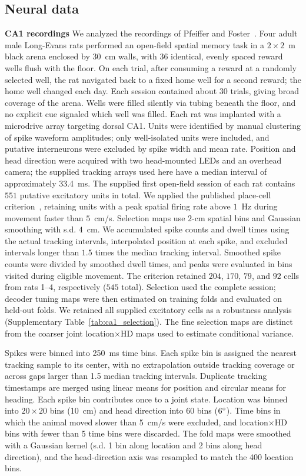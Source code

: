 \documentclass[11pt]{article}
\begin{document}
\subsection{Neural data}

{\bf CA1 recordings}
We analyzed the recordings of Pfeiffer and Foster~\cite{Pfeiffer2013}. Four adult male Long-Evans rats performed an open-field spatial memory task in a $2 \times 2$~m black arena enclosed by 30~cm walls, with 36 identical, evenly spaced reward wells flush with the floor. On each trial, after consuming a reward at a randomly selected well, the rat navigated back to a fixed home well for a second reward; the home well changed each day. Each session contained about 30 trials, giving broad coverage of the arena. Wells were filled silently via tubing beneath the floor, and no explicit cue signaled which well was filled.
Each rat was implanted with a microdrive array targeting dorsal CA1. Units were identified by manual clustering of spike waveform amplitudes; only well-isolated units were included, and putative interneurons were excluded by spike width and mean rate. Position and head direction were acquired with two head-mounted LEDs and an overhead camera; the supplied tracking arrays used here have a median interval of approximately 33.4~ms. The supplied first open-field session of each rat contains $551$ putative excitatory units in total. We applied the published place-cell criterion~\cite{Pfeiffer2013}, retaining units with a peak spatial firing rate above $1$~Hz during movement faster than $5$~cm/s. Selection maps use $2$-cm spatial bins and Gaussian smoothing with s.d. $4$~cm. We accumulated spike counts and dwell times using the actual tracking intervals, interpolated position at each spike, and excluded intervals longer than $1.5$ times the median tracking interval. Smoothed spike counts were divided by smoothed dwell times, and peaks were evaluated in bins visited during eligible movement. The criterion retained $204$, $170$, $79$, and $92$ cells from rats 1--4, respectively ($545$ total). Selection used the complete session; decoder tuning maps were then estimated on training folds and evaluated on held-out folds. We retained all supplied excitatory cells as a robustness analysis (Supplementary Table~\ref{tab:ca1_selection}). The fine selection maps are distinct from the coarser joint location$\times$HD maps used to estimate conditional variance.

Spikes were binned into 250~ms time bins. Each spike bin is assigned the nearest tracking sample to its center, with no extrapolation outside tracking coverage or across gaps larger than 1.5 median tracking intervals. Duplicate tracking timestamps are merged using linear means for position and circular means for heading. Each spike bin contributes once to a joint state. Location was binned into $20\times 20$ bins (10~cm) and head direction into 60 bins ($6\degree$). Time bins in which the animal moved slower than 5~cm/s were excluded, and location$\times$HD bins with fewer than 5 time bins were discarded. The fold maps were smoothed with a Gaussian kernel (s.d. 1 bin along location and 2 bins along head direction), and the head-direction axis was resampled to match the 400 location bins.
\end{document}
